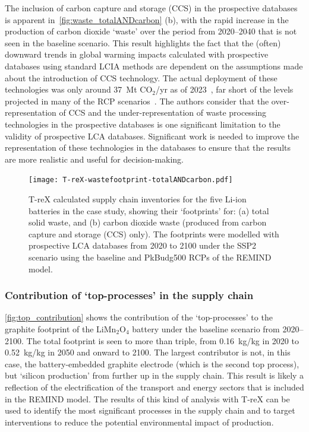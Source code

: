 \documentclass[a4paper,fleqn]{cas-dc}
\begin{document}
	The inclusion of carbon capture and storage (CCS) in the prospective databases
	is apparent in~\autoref{fig:waste_totalANDcarbon} (b), with the rapid increase
	in the production of carbon dioxide `waste' over the period from 2020--2040
	that is not seen in the baseline scenario. This result highlights the fact that
	the (often) downward trends in global warming impacts calculated with
	prospective databases using standard LCIA methods are dependent on the
	assumptions made about the introduction of CCS technology. The actual
	deployment of these technologies was only around 37~Mt CO\(_2\)/yr as of
	2023~\citep{dziejarski2023ccs}, far short of the levels projected in many of
	the RCP scenarios~\citep{sacchi2023premisedocs}. The authors consider that the
	over-representation of CCS and the under-representation of waste processing
	technologies in the prospective databases is one significant limitation to the
	validity of prospective LCA databases. Significant work is needed to improve
	the representation of these technologies in the databases to ensure that the
	results are more realistic and useful for decision-making.
	
	\begin{figure}[!htbp]
		\centering
		\texttt{[image: T-reX-wastefootprint-totalANDcarbon.pdf]}
		\caption{T-reX calculated supply chain inventories for the five Li-ion batteries in the case study, showing their `footprints' for: (a) total solid waste, and (b) carbon dioxide waste (produced from carbon capture and storage (CCS) only). The footprints were modelled with prospective LCA databases from 2020 to 2100 under the SSP2 scenario using the baseline and PkBudg500 RCPs of the REMIND model.}\label{fig:waste_totalANDcarbon}
	\end{figure}
	
	
	\subsubsection{Contribution of `top-processes' in the supply chain}\label{sec:results-case_study-topprocesses}
	
	\autoref{fig:top_contribution} shows the contribution of the `top-processes' to the graphite footprint of the  LiMn\(_2\)O\(_4\) battery under the baseline scenario from 2020--2100. The total footprint is seen to more than triple, from 0.16~kg/kg in 2020 to 0.52~kg/kg in 2050 and onward to 2100. The largest contributor is not, in this case, the battery-embedded graphite electrode (which is the second top process), but `silicon production' from further up in the supply chain. This result is likely a reflection of the electrification of the transport and energy sectors that is included in the REMIND model. The results of this kind of analysis with T-reX can be used to identify the most significant processes in the supply chain and to target interventions to reduce the potential environmental impact of production.
	
\end{document}
